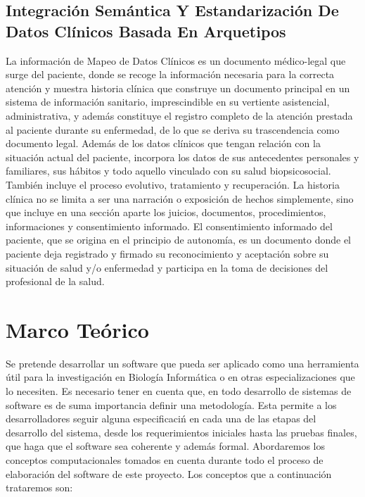 \documentclass[10pt,a4paper]{article}
\begin{document}
\subsection{Integración Semántica Y Estandarización De Datos Clínicos Basada En Arquetipos}

La informaci\'on de  Mapeo de Datos Cl\'inicos es un documento m\'edico-legal que surge del paciente, donde se recoge la informaci\'on necesaria para la correcta atenci\'on y muestra historia cl\'inica que construye un documento principal en un sistema de informaci\'on sanitario, imprescindible en su vertiente asistencial, administrativa, y adem\'as constituye el registro completo de la atenci\'on prestada al paciente durante su enfermedad, de lo que se deriva su trascendencia como documento legal. Adem\'as de los datos cl\'inicos que tengan relaci\'on con la situaci\'on actual del paciente, incorpora los datos de sus antecedentes personales y familiares, sus h\'abitos y todo aquello vinculado con su salud biopsicosocial. Tambi\'en incluye el proceso evolutivo, tratamiento y recuperaci\'on. La historia cl\'inica no se limita a ser una narraci\'on o exposici\'on de hechos simplemente, sino que incluye en una secci\'on aparte los juicios, documentos, procedimientos, informaciones y consentimiento informado. El consentimiento informado del paciente, que se origina en el principio de autonom\'ia, es un documento donde el paciente deja registrado y firmado su reconocimiento y aceptaci\'on sobre su situaci\'on de salud y/o enfermedad y participa en la toma de decisiones del profesional de la salud.\cite{leal2013}

\section{Marco Teórico}

Se pretende desarrollar un software que pueda ser aplicado como una herramienta \'util para la investigaci\'on en Biolog\'ia Inform\'atica o en otras especializaciones que lo necesiten. Es necesario tener en cuenta que, en todo desarrollo de sistemas de software es de suma importancia definir una metodolog\'ia. Esta permite a los desarrolladores seguir alguna especificaci\'n en cada una de las etapas del desarrollo del sistema, desde los requerimientos iniciales hasta las pruebas finales, que haga que el software sea coherente y adem\'as formal.
Abordaremos los conceptos computacionales tomados en cuenta durante todo el proceso de elaboraci\'on del software de este proyecto. Los conceptos que a continuaci\'on trataremos son:
\end{document}
